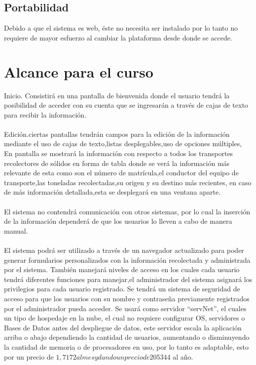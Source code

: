 \subsection{Portabilidad}
Debido a que el sistema es web, éste no necesita ser instalado por lo tanto no requiere de mayor esfuerzo al cambiar la plataforma desde donde se accede.
\section{Alcance para el curso}

\textbullet Inicio. Consistirá en una pantalla de bienvenida donde el usuario tendrá la posibilidad de acceder  con su cuenta que se ingresarán a través de cajas de texto para recibir la información.\\\\

\textbullet Edición.ciertas pantallas tendrán  campos  para la edición de la información mediante el uso de cajas de texto,listas desplegables,uso de opciones múltiples, 
En pantalla se  mostrará la información con respecto a todos  los transportes recolectores de sólidos en forma de tabla donde se verá la información más relevante de esta como son el número de matrícula,el conductor del equipo de transporte,las toneladas recolectadas,su origen y su destino más recientes, en caso de más información detallada,esta se desplegará en una ventana aparte.\\\\

\textbullet El sistema no contendrá comunicación con otros sistemas, por lo cual la inserción de la información dependerá de que los usuarios lo lleven a cabo de manera manual.\\\\

El sistema podrá ser utilizado a través de un navegador actualizado para poder generar formularios personalizados con la información recolectada y administrada por el sistema.
También manejará niveles de acceso en los cuales cada usuario tendrá diferentes funciones para manejar,el administrador del sistema asignará los privilegios para cada usuario registrado. 
Se tendrá un sistema de seguridad de acceso para que los usuarios con su nombre y contraseña previamente registrados por el administrador pueda acceder.
Se usará como servidor “servNet”, el cuales un tipo de hospedaje en la nube, el cual no requiere configurar OS, servidores o Bases de Datos antes del despliegue de datos, este servidor escala la aplicación arriba o abajo dependiendo la cantidad de usuarios, aumentando o disminuyendo la cantidad de memoria o de procesadores en uso, por lo tanto es adaptable, esto por un precio de $1,7172 al mes y dando un precio de $205344 al año.


